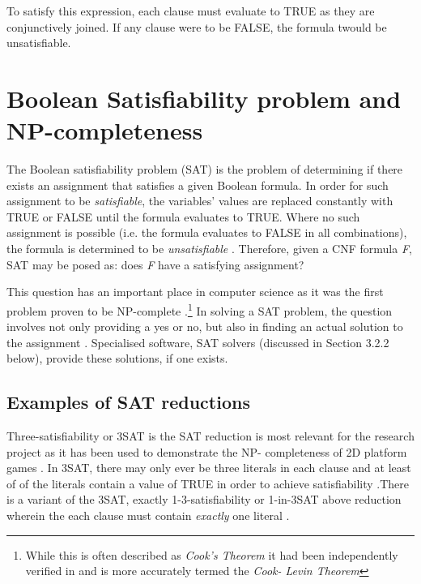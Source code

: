 \documentclass[11pt, a4paper, oneside]{report} %
\begin{document}
\par  \noindent To satisfy this expression, each clause must evaluate to TRUE as
they are conjunctively joined. If any clause were to be FALSE, the formula
twould be unsatisfiable.

\section{Boolean Satisfiability problem and NP-completeness}

The Boolean satisfiability problem (SAT) is the problem of determining if there
exists an assignment that satisfies a given Boolean formula. In order for such
assignment to be \textit{satisfiable}, the variables' values are replaced
constantly with TRUE or FALSE until the formula evaluates to TRUE. Where no such
assignment is possible (i.e. the formula evaluates to FALSE in all
combinations), the formula is determined to be \textit{unsatisfiable}
\cite{balyo2010solving,gomes2008satisfiability}. Therefore, given a CNF formula
\textit{F}, SAT may be posed as: does \textit{F} have a satisfying assignment?

This question has an important place in computer science as it was the first
problem proven to be NP-complete \cite{cook1971complexity}.\footnote{While this
is often described as \textit{Cook's Theorem} it had been independently verified
in \cite{levin1973universal} and is more accurately termed the \textit{Cook-
Levin Theorem}} In solving a SAT problem, the question involves not only
providing a yes or no, but also in finding an actual solution to the assignment
\cite{zhang2002quest}. Specialised software, SAT solvers (discussed in Section
3.2.2 below), provide these solutions, if one exists.

\subsection{Examples of SAT reductions}

Three-satisfiability or 3SAT is the SAT reduction is most relevant for the
research project as it has been used to demonstrate the NP- completeness of 2D
platform games  \cite{Aloupis2012}. In 3SAT, there may only ever be three
literals in each clause and at least of of the literals contain a value of TRUE
in order to achieve satisfiability \cite{balyo2010solving}.There is a variant of
the 3SAT, exactly 1-3-satisfiability or 1-in-3SAT above reduction wherein the
each clause must contain \textit{exactly} one literal \cite{balyo2010solving,
du2011theory}.
\end{document}
